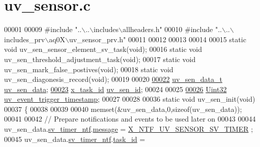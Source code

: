 \hypertarget{a00073_source}{\section{uv\+\_\+sensor.\+c}
\label{a00073_source}
}

\begin{DoxyCode}
00001 
00009 \textcolor{preprocessor}{#include "..\(\backslash\)..\(\backslash\)includes\(\backslash\)allheaders.h"}
00010 \textcolor{preprocessor}{#include "..\(\backslash\)..\(\backslash\)includes\_prv\(\backslash\)aq0X\(\backslash\)uv\_sensor\_prv.h"}
00011 
00012 
00013 
00014 
00015 \textcolor{keyword}{static} \textcolor{keywordtype}{void}             uv\_sen\_sensor\_element\_sv\_task(\textcolor{keywordtype}{void});
00016 \textcolor{keyword}{static} \textcolor{keywordtype}{void}             uv\_sen\_threshold\_adjustment\_task(\textcolor{keywordtype}{void});
00017 \textcolor{keyword}{static} \textcolor{keywordtype}{void}             uv\_sen\_mark\_false\_postives(\textcolor{keywordtype}{void});
00018 \textcolor{keyword}{static} \textcolor{keywordtype}{void}             uv\_sen\_diagonesis\_record(\textcolor{keywordtype}{void});
00019 
00020 
\hypertarget{a00073_source_l00022}{}\hyperlink{a00073_adb4cffe9b88704fe686a94fe9996fa52}{00022} \hyperlink{a00035_d9/d30/a00848}{uv\_sen\_data\_t} \hyperlink{a00073_adb4cffe9b88704fe686a94fe9996fa52}{uv\_sen\_data};
\hypertarget{a00073_source_l00023}{}\hyperlink{a00073_afd789f3f9ea182d28d4f16db0d8d5652}{00023} \hyperlink{a00036_ad5c3c5fbfd3e4aadf22830395484a71d}{x\_task\_id}        \hyperlink{a00073_afd789f3f9ea182d28d4f16db0d8d5652}{uv\_sen\_id};
00024 
00025 
\hypertarget{a00073_source_l00026}{}\hyperlink{a00073_a4e8cc59a7a6d147cfe43b64ce2f44e7a}{00026} \hyperlink{a00072_aba99025e657f892beb7ff31cecf64653}{Uint32}           \hyperlink{a00073_a4e8cc59a7a6d147cfe43b64ce2f44e7a}{uv\_event\_trigger\_timestamp};
00027 
00028 
00036  \textcolor{keyword}{static} \textcolor{keywordtype}{void} uv\_sen\_init(\textcolor{keywordtype}{void})
00037 \{
00038 
00039 
00040     memset(&uv\_sen\_data,0,\textcolor{keyword}{sizeof}(uv\_sen\_data));
00041 
00042     \textcolor{comment}{// Prepare notifications and events to be used later on}
00043 
00044     uv\_sen\_data.\hyperlink{a00035_ada91b200053f2d93e3639dc4ee3415b4}{sv\_timer\_ntf}.\hyperlink{a00036_adf9665938515a20c283eea2c978cf80d}{message}                             = 
      \hyperlink{a00035_a2ab2f7f60fff32ecaf2859625e76a868}{X\_NTF\_UV\_SENSOR\_SV\_TIMER} ;
00045     uv\_sen\_data.\hyperlink{a00035_ada91b200053f2d93e3639dc4ee3415b4}{sv\_timer\_ntf}.\hyperlink{a00036_a21b41e494a28583d4da10f1afb1c5328}{task\_id}                          = 

\end{DoxyCode}
